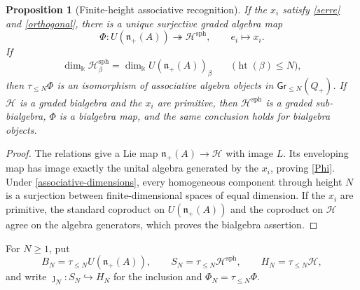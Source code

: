\documentclass[11pt]{article}
\newtheorem{proposition}[theorem]{Proposition}
\newcommand{\kk}{\Bbbk}
\newcommand{\htop}{\operatorname{ht}}
\begin{document}
\begin{proposition}[Finite-height associative recognition]    \label{associative-recognition}
If the $x_i$ satisfy \eqref{serre} and \eqref{orthogonal}, there is a unique
surjective graded algebra map
\begin{equation}
 \Phi:U(\mathfrak n_+(A))\twoheadrightarrow
       \mathcal H^{\mathrm{sph}},\qquad e_i\longmapsto x_i.    \label{Phi}
\end{equation}
If
\begin{equation}
 \dim_\kk\mathcal H^{\mathrm{sph}}_\beta
 =\dim_\kk U(\mathfrak n_+(A))_\beta
 \qquad\bigl(\htop(\beta)\leq N\bigr),                        \label{associative-dimensions}
\end{equation}
then $\tau_{\leq N}\Phi$ is an isomorphism of associative algebra objects
in $\mathsf{Gr}_{\leq N}(Q_+)$.  If $\mathcal H$ is a graded bialgebra and
the $x_i$ are primitive, then $\mathcal H^{\mathrm{sph}}$ is a graded
sub-bialgebra, $\Phi$ is a bialgebra map, and the same conclusion holds for
bialgebra objects.
\end{proposition}

\begin{proof}
The relations give a Lie map
$\mathfrak n_+(A)\to\mathcal H$ with image $L$.  Its enveloping map has
image exactly the unital algebra generated by the $x_i$, proving
\eqref{Phi}.  Under \eqref{associative-dimensions}, every homogeneous
component through height $N$ is a surjection between finite-dimensional
spaces of equal dimension.  If the $x_i$ are primitive, the standard
coproduct on $U(\mathfrak n_+(A))$ and the coproduct on $\mathcal H$ agree
on the algebra generators, which proves the bialgebra assertion.
\end{proof}

For $N\geq1$, put
\[
 B_N=\tau_{\leq N}U(\mathfrak n_+(A)),\qquad
 S_N=\tau_{\leq N}\mathcal H^{\mathrm{sph}},\qquad
 H_N=\tau_{\leq N}\mathcal H,
\]
and write $\jmath_N:S_N\hookrightarrow H_N$ for the inclusion and
$\Phi_N=\tau_{\leq N}\Phi$.
\end{document}
